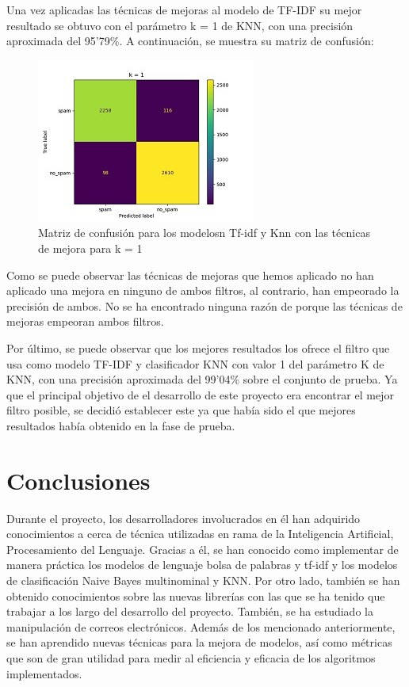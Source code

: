 \documentclass[conference,a4paper]{IEEEtran}
\begin{document}
Una vez aplicadas las técnicas de mejoras al modelo de TF-IDF su mejor resultado se obtuvo con el parámetro k = 1 de KNN, con una precisión aproximada del 95’79\%. A continuación, se muestra su matriz de confusión:

\begin{figure}[hbtp]
\caption{Matriz de confusión para los modelosn Tf-idf y Knn con las técnicas de mejora para k = 1}
\centering
\includegraphics[scale=1]{tf-idfCM.jpg}
\end{figure}


Como se puede observar las técnicas de mejoras que hemos aplicado no han aplicado una mejora en ninguno de ambos filtros, al contrario, han empeorado la precisión de ambos. No se ha encontrado ninguna razón de porque las técnicas de mejoras empeoran ambos filtros.

Por último, se puede observar que los mejores resultados los ofrece el filtro que usa como modelo TF-IDF y clasificador KNN con valor 1 del parámetro K de KNN, con una precisión aproximada del 99’04\% sobre el conjunto de prueba. Ya que el principal objetivo de el desarrollo de este proyecto era encontrar el mejor filtro posible, se decidió establecer este ya que había sido el que mejores resultados había obtenido en la fase de prueba.





\section{Conclusiones}

Durante el proyecto, los desarrolladores involucrados en él han adquirido conocimientos a cerca de técnica utilizadas en rama de la Inteligencia Artificial, Procesamiento del Lenguaje. Gracias a él, se han conocido como implementar de manera práctica los modelos de lenguaje bolsa de palabras y tf-idf y los modelos de clasificación Naive Bayes multinominal y KNN. Por otro lado, también se han obtenido conocimientos sobre las nuevas librerías con las que se ha tenido que trabajar a los largo del desarrollo del proyecto. También, se ha estudiado la manipulación de correos electrónicos. Además de los mencionado anteriormente, se han aprendido nuevas técnicas para la mejora de modelos, así como métricas que son de gran utilidad para medir al eficiencia y eficacia de los algoritmos implementados.
\end{document}
